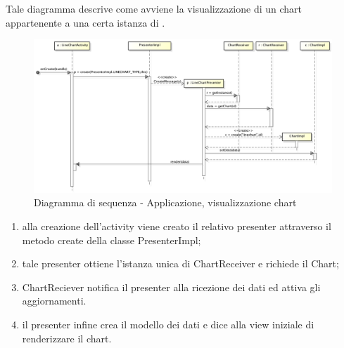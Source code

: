             Tale diagramma descrive come avviene la visualizzazione di un chart appartenente a una certa istanza di .
            \begin{figure}[H]
                \centering
                \includegraphics[scale=0.3]{DefinizioneDiProdotto/Pics/ApplicazioneVisualizzazioneChart}
                \caption{Diagramma di sequenza - Applicazione, visualizzazione chart}
            \end{figure}
            \begin{enumerate}
                \item alla creazione dell'activity viene creato il relativo presenter attraverso il metodo create della classe PresenterImpl;
                \item tale presenter ottiene l'istanza unica di ChartReceiver e richiede il Chart;
                \item ChartReciever notifica il presenter alla ricezione dei dati ed attiva gli aggiornamenti.
                \item il presenter infine crea il modello dei dati e dice alla view iniziale di renderizzare il chart.
            \end{enumerate}
            
